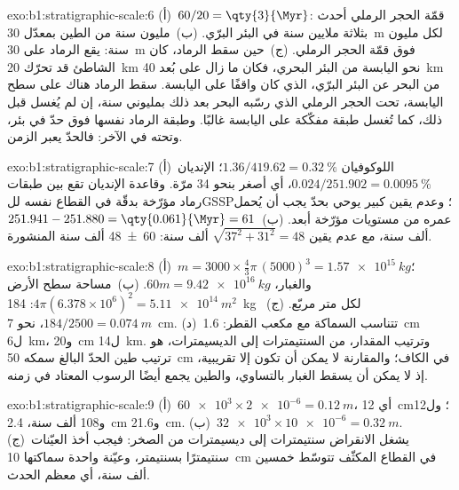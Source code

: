 \begin{solution}{exo:b1:stratigraphic-scale:6}
(أ)~$60/20 = \qty{3}{\Myr}$: قمّة الحجر الرملي أحدث بثلاثة ملايين سنة في البئر البرّي. (ب)~مليون سنة من الطين بمعدّل \qty{30}{m} لكل مليون سنة: يقع الرماد على \qty{30}{m} فوق قمّة الحجر الرملي. (ج)~حين سقط الرماد، كان الشاطئ قد تحرّك \qty{20}{km} نحو اليابسة من البئر البحري، فكان ما زال على بُعد \qty{40}{km} من البحر عن البئر البرّي، الذي كان واقفًا على اليابسة. سقط الرماد هناك على سطح اليابسة، تحت الحجر الرملي الذي رسّبه البحر بعد ذلك بمليوني سنة، إن لم يُغسل قبل ذلك، كما تُغسل طبقة مفكّكة على اليابسة غالبًا. وطبقة الرماد نفسها فوق حدّ  في بئر، وتحته في الآخر: فالحدّ يعبر الزمن.
\end{solution}

\begin{solution}{exo:b1:stratigraphic-scale:7}
(أ)~اللوكوفيان $1.36/419.62 = \qty{0.32}{\%}$؛ الإنديان $0.024/251.902 =
\qty{0.0095}{\%}$، أي أصغر بنحو 34 مرّة. وقاعدة الإنديان تقع بين طبقات رماد مؤرّخة بدقّة في القطاع نفسه للGSSP؛ وعدم يقين كبير يوحي بحدّ يجب أن يُحمل عمره من مستويات مؤرّخة أبعد. (ب)~$251.941 - 251.880 = \qty{0.061}{\Myr} = 61$ ألف سنة، مع عدم يقين $\sqrt{37^2 + 31^2} = 48$ ألف سنة: \num[uncertainty-mode=separate]{60 \pm 48} ألف سنة المنشورة.
\end{solution}

\begin{solution}{exo:b1:stratigraphic-scale:8}
(أ)~$m = 3000 \times \frac43\pi\,(5000)^3 = \qty{1.57e15}{kg}$؛ والغبار، $60m = \qty{9.42e16}{kg}$. (ب)~مساحة سطح الأرض $4\pi(6.378\times10^6)^2
= \qty{5.11e14}{m^2}$: \qty{184}{kg} لكل متر مربّع. (ج)~$184/2500 =
\qty{0.074}{m}$، نحو \qty{7}{cm}. (د)~تتناسب السماكة مع مكعب القطر: \qty{1.6}{cm} ل\qty{6}{km}، و\qty{20}{cm} ل\qty{14}{km}. وترتيب المقدار، من السنتيمترات إلى الديسيمترات، هو ترتيب طين الحدّ البالغ سمكه \qty{50}{cm} في الكاف؛ والمقارنة لا يمكن أن تكون إلا تقريبية، إذ لا يمكن أن يسقط الغبار بالتساوي، والطين يجمع أيضًا الرسوب المعتاد في زمنه.
\end{solution}

\begin{solution}{exo:b1:stratigraphic-scale:9}
(أ)~$\num{60e3} \times \num{2e-6} = \qty{0.12}{m}$، أي \qty{12}{cm}؛ ول\num{12} و\num{108} ألف سنة، \qty{2.4}{cm} و\qty{21.6}{cm}. (ب)~$\num{32e3} \times
\num{10e-6} = \qty{0.32}{m}$. (ج)~يشغل الانقراض سنتيمترات إلى ديسيمترات من الصخر: فيجب أخذ العيّنات سنتيمترًا بسنتيمتر، وعيّنة واحدة سماكتها \qty{10}{cm} في القطاع المكثّف تتوسّط خمسين ألف سنة، أي معظم الحدث.
\end{solution}

